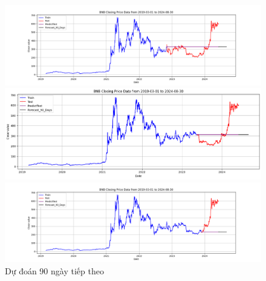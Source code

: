 \documentclass[conference]{IEEEtran}
\begin{document}
\begin{figure}[H]
    \centering
    \begin{minipage}{0.15\textwidth}
    \centering
    \includegraphics[width=1\textwidth]{Figure/ARIMA_BNB_90days_73.png}
    \end{minipage}
    \hfill
    \begin{minipage}{0.15\textwidth}
    \centering
    \includegraphics[width=1\textwidth]{Figure/ARIMA_BNB_90days_82.png}
    \end{minipage}
    \hfill
    \begin{minipage}{0.15\textwidth}
    \centering
    \includegraphics[width=1\textwidth]{Figure/ARIMA_BNB_90days_91.png}
    \end{minipage}
    \caption{Dự đoán 90 ngày tiếp theo}
    \label{fig:1}
\end{figure}
\end{document}

